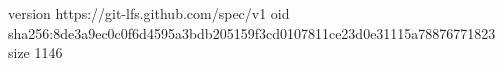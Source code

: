 version https://git-lfs.github.com/spec/v1
oid sha256:8de3a9ec0c0f6d4595a3bdb205159f3cd0107811ce23d0e31115a78876771823
size 1146
